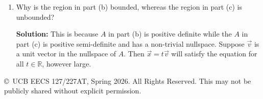 \documentclass[10pt]{article}
\newcommand{\RR}{\mathbb{R}}
\begin{document}
\begin{enumerate}[label=(\alph*)]
    \textbf{Solution:} Call the given matrix as $A$. The eigenvalues of $A$ can be found by solving,
    \begin{align}
        \det(A - \lambda I) &= 0 \\
        \implies (1 - \lambda)^2 - 1 &= 0 \\
        \implies \lambda = 0, &\text{ or } \lambda = 2.
    \end{align}
    The eigenvector associated with eigenvalue $0$, say $\vec{v}_1$, is $\left[\frac{1}{\sqrt{2}},\, \frac{1}{\sqrt{2}}\right]^\top$. The eigenvector associated with eigenvalue $2$, say $\vec{v}_2$, is $\left[\frac{1}{\sqrt{2}},\, -\frac{1}{\sqrt{2}}\right]$. Observe that $\vec{v}_1, \vec{v}_2$ are orthonormal vectors, and any $\vec{x} \in \RR^2$ can be written as $\vec{x} = a\vec{v}_1 + b\vec{v}_2$, for $a, b \in \RR$. Then,
    \begin{align}
        \vec{x}^\top A\vec{x} &= (a\vec{v}_1 + b\vec{v}_2)^\top A(a\vec{v}_1 + b\vec{v}_2) \\
        &= a^2 \vec{v}_1^\top A\vec{v}_1 + b^2 \vec{v}_2^\top A\vec{v}_2 + ab\vec{v}_1^\top A\vec{v}_2 + ba\vec{v}_2^\top A\vec{v}_1 \\
        &= 2b^2.
    \end{align}
    Thus we have the condition $|b| \leq \frac{1}{\sqrt{2}}$. Note that $a$ is a free parameter and can take any value in $\RR$. Thus the region is a strip parallel to the line $y = x$ of width $\sqrt{2}$. Note that the strip is not bounded and any $\vec{x} = a\vec{v}_1$ satisfies the condition for all $a \in \RR$.

    \item Why is the region in part (b) bounded, whereas the region in part (c) is unbounded?

    \textbf{Solution:} This is because $A$ in part (b) is positive definite while the $A$ in part (c) is positive semi-definite and has a non-trivial nullspace. Suppose $\vec{v}$ is a unit vector in the nullspace of $A$. Then $\vec{x} = t\vec{v}$ will satisfy the equation for all $t \in \RR$, however large.
\end{enumerate}

\vfill
\noindent\footnotesize{\copyright\ UCB EECS 127/227AT, Spring 2026. All Rights Reserved. This may not be publicly shared without explicit permission.}
\end{document}

